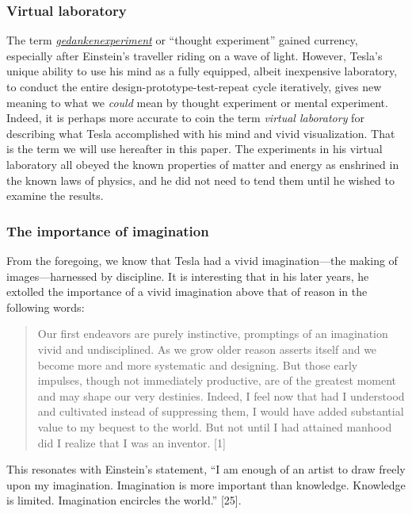 \documentclass[
  11pt,
  a4paper,
]{article}
\begin{document}
\hypertarget{virtual-laboratory}{%
\subsubsection{Virtual laboratory}\label{virtual-laboratory}}

The term
\href{https://www.britannica.com/science/Gedankenexperiment}{\emph{gedankenexperiment}}
or ``thought experiment'' gained currency, especially after Einstein's
traveller riding on a wave of light. However, Tesla's unique ability to
use his mind as a fully equipped, albeit inexpensive laboratory, to
conduct the entire design-prototype-test-repeat cycle iteratively, gives
new meaning to what we \emph{could} mean by thought experiment or mental
experiment. Indeed, it is perhaps more accurate to coin the term
\emph{virtual laboratory} for describing what Tesla accomplished with
his mind and vivid visualization. That is the term we will use hereafter
in this paper. The experiments in his virtual laboratory all obeyed the
known properties of matter and energy as enshrined in the known laws of
physics, and he did not need to tend them until he wished to examine the
results.

\hypertarget{the-importance-of-imagination}{%
\subsubsection{The importance of
imagination}\label{the-importance-of-imagination}}

From the foregoing, we know that Tesla had a vivid imagination---the
making of images---harnessed by discipline. It is interesting that in
his later years, he extolled the importance of a vivid imagination above
that of reason in the following words:

\begin{quote}
Our first endeavors are purely instinctive, promptings of an imagination
vivid and undisciplined. As we grow older reason asserts itself and we
become more and more systematic and designing. But those early impulses,
though not immediately productive, are of the greatest moment and may
shape our very destinies. Indeed, I feel now that had I understood and
cultivated instead of suppressing them, I would have added substantial
value to my bequest to the world. But not until I had attained manhood
did I realize that I was an inventor. {[}1{]}
\end{quote}

This resonates with Einstein's statement, ``I am enough of an artist to
draw freely upon my imagination. Imagination is more important than
knowledge. Knowledge is limited. Imagination encircles the world.''
{[}25{]}.
\end{document}

